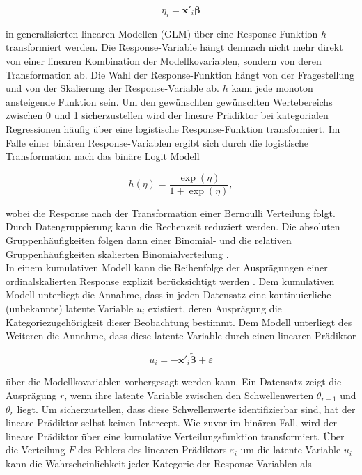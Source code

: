 \documentclass{Vorlage}
\begin{document}
\begin{equation} \label{linPraed}
\eta_{i} =\mathbf{x}'_i \boldsymbol{\beta}
\end{equation}

in generalisierten linearen Modellen (GLM) über eine Response-Funktion $h$ transformiert werden. Die Response-Variable hängt demnach nicht mehr direkt von einer linearen Kombination der Modellkovariablen, sondern von deren Transformation ab. Die Wahl der Response-Funktion hängt von der Fragestellung und von der Skalierung der Response-Variable ab. $h$ kann jede monoton ansteigende Funktion sein. Um den gewünschten gewünschten Wertebereichs zwischen 0 und 1 sicherzustellen wird der lineare Prädiktor bei kategorialen Regressionen häufig über eine logistische Response-Funktion transformiert. Im Falle einer binären Response-Variablen ergibt sich durch die logistische Transformation nach \cite[p. 270 f.]{fahrmeir2013regression} das binäre Logit Modell

\begin{equation} \label{logit}
h(\eta)=\frac{\exp(\eta)}{1+\exp(\eta)},
\end{equation}

wobei die Response nach der Transformation einer Bernoulli Verteilung folgt. Durch Datengruppierung kann die Rechenzeit reduziert werden. Die absoluten Gruppenhäufigkeiten folgen dann einer Binomial- und die relativen Gruppenhäufigkeiten skalierten Binomialverteilung \cite[p. 277 f.]{fahrmeir2013regression}.\\
In einem kumulativen Modell kann die Reihenfolge der Ausprägungen einer ordinalskalierten Response explizit berücksichtigt werden \cite[p.334 ff.]{fahrmeir2013regression}. Dem kumulativen Modell unterliegt die Annahme, dass in jeden Datensatz eine kontinuierliche (unbekannte) latente Variable $u_i$ existiert, deren Ausprägung die Kategoriezugehörigkeit dieser Beobachtung bestimmt. Dem Modell unterliegt des Weiteren die Annahme, dass diese latente Variable durch einen linearen Prädiktor

\begin{equation}
u_i=-\mathbf{x}'_i \boldsymbol{\tilde{\beta}}+\varepsilon
\end{equation}

über die Modellkovariablen vorhergesagt werden kann. Ein Datensatz zeigt die Ausprägung $r$, wenn ihre latente Variable zwischen den Schwellenwerten $\theta_{r-1}$ und $\theta_r$ liegt. Um sicherzustellen, dass diese Schwellenwerte identifizierbar sind, hat der lineare Prädiktor selbst keinen Intercept. Wie zuvor im binären Fall, wird der lineare Prädiktor über eine kumulative Verteilungsfunktion transformiert. Über die Verteilung $F$ des Fehlers des linearen Prädiktors  $\varepsilon_i$ um die latente Variable $u_i$ kann die Wahrscheinlichkeit jeder Kategorie der Response-Variablen als 
\end{document}
